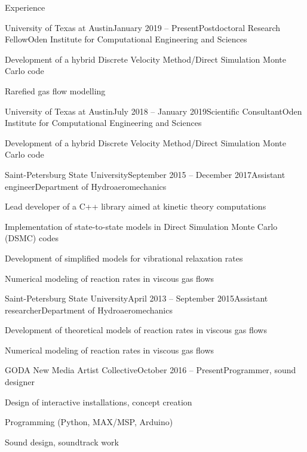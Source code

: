 \documentclass{resume} %
\begin{document}

\begin{rSection}{Experience}

\begin{rSubsection}{University of Texas at Austin}{January 2019 -- Present}{Postdoctoral Research Fellow}{Oden Institute for Computational Engineering and Sciences}
\item Development of a hybrid Discrete Velocity Method/Direct Simulation Monte Carlo code
\item Rarefied gas flow modelling
\end{rSubsection}


\begin{rSubsection}{University of Texas at Austin}{July 2018 -- January 2019}{Scientific Consultant}{Oden Institute for Computational Engineering and Sciences}
\item Development of a hybrid Discrete Velocity Method/Direct Simulation Monte Carlo code
\end{rSubsection}

\begin{rSubsection}{Saint-Petersburg State University}{September 2015 -- December 2017}{Assistant engineer}{Department of Hydroaeromechanics}
\item Lead developer of a C++ library aimed at kinetic theory computations
\item Implementation of state-to-state models in Direct Simulation Monte Carlo (DSMC) codes
\item Development of simplified models for vibrational relaxation rates
\item Numerical modeling of reaction rates in viscous gas flows
\end{rSubsection}

\begin{rSubsection}{Saint-Petersburg State University}{April 2013 -- September 2015}{Assistant researcher}{Department of Hydroaeromechanics}
\item Development of theoretical models of reaction rates in viscous gas flows
\item Numerical modeling of reaction rates in viscous gas flows
\end{rSubsection}

\begin{rSubsection}{GODA New Media Artist Collective}{October 2016 -- Present}{Programmer, sound designer}{}
\item Design of interactive installations, concept creation
\item Programming (Python, MAX/MSP, Arduino)
\item Sound design, soundtrack work
\end{rSubsection}


\end{rSection}
\end{document}
